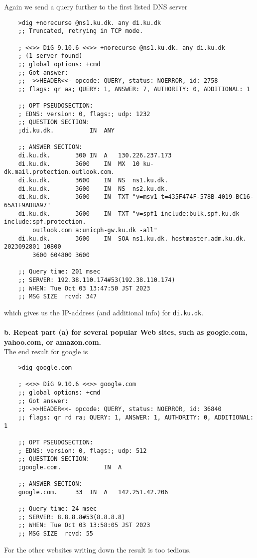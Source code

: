 Again we send a query further to the first listed DNS server
\begin{verbatim}
    >dig +norecurse @ns1.ku.dk. any di.ku.dk
    ;; Truncated, retrying in TCP mode.
    
    ; <<>> DiG 9.10.6 <<>> +norecurse @ns1.ku.dk. any di.ku.dk
    ; (1 server found)
    ;; global options: +cmd
    ;; Got answer:
    ;; ->>HEADER<<- opcode: QUERY, status: NOERROR, id: 2758
    ;; flags: qr aa; QUERY: 1, ANSWER: 7, AUTHORITY: 0, ADDITIONAL: 1
    
    ;; OPT PSEUDOSECTION:
    ; EDNS: version: 0, flags:; udp: 1232
    ;; QUESTION SECTION:
    ;di.ku.dk.			IN	ANY
    
    ;; ANSWER SECTION:
    di.ku.dk.		300	IN	A	130.226.237.173
    di.ku.dk.		3600	IN	MX	10 ku-dk.mail.protection.outlook.com.
    di.ku.dk.		3600	IN	NS	ns1.ku.dk.
    di.ku.dk.		3600	IN	NS	ns2.ku.dk.
    di.ku.dk.		3600	IN	TXT	"v=msv1 t=435F474F-578B-4019-BC16-65A1E9ADBA97"
    di.ku.dk.		3600	IN	TXT	"v=spf1 include:bulk.spf.ku.dk include:spf.protection.
        outlook.com a:unicph-gw.ku.dk -all"
    di.ku.dk.		3600	IN	SOA	ns1.ku.dk. hostmaster.adm.ku.dk. 2023092801 10800 
        3600 604800 3600
    
    ;; Query time: 201 msec
    ;; SERVER: 192.38.110.174#53(192.38.110.174)
    ;; WHEN: Tue Oct 03 13:47:50 JST 2023
    ;; MSG SIZE  rcvd: 347
\end{verbatim}
which gives us the IP-address (and additional info) for \texttt{di.ku.dk}. \\
\\
\textbf{b. Repeat part (a) for several popular Web sites, such as google.com, yahoo.com, or amazon.com.} \\
The end result for google is
\begin{verbatim}
    >dig google.com 

    ; <<>> DiG 9.10.6 <<>> google.com
    ;; global options: +cmd
    ;; Got answer:
    ;; ->>HEADER<<- opcode: QUERY, status: NOERROR, id: 36840
    ;; flags: qr rd ra; QUERY: 1, ANSWER: 1, AUTHORITY: 0, ADDITIONAL: 1
    
    ;; OPT PSEUDOSECTION:
    ; EDNS: version: 0, flags:; udp: 512
    ;; QUESTION SECTION:
    ;google.com.			IN	A
    
    ;; ANSWER SECTION:
    google.com.		33	IN	A	142.251.42.206
    
    ;; Query time: 24 msec
    ;; SERVER: 8.8.8.8#53(8.8.8.8)
    ;; WHEN: Tue Oct 03 13:58:05 JST 2023
    ;; MSG SIZE  rcvd: 55
\end{verbatim}
For the other websites writing down the result is too tedious.

